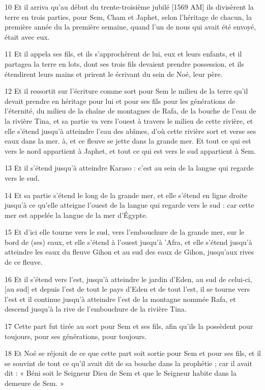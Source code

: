 \par 10 Et il arriva qu'au début du trente-troisième jubilé [1569 AM] ils divisèrent la terre en trois parties, pour Sem, Cham et Japhet, selon l'héritage de chacun, la première année du la première semaine, quand l'un de nous qui avait été envoyé, était avec eux.
\par 11 Et il appela ses fils, et ils s'approchèrent de lui, eux et leurs enfants, et il partagea la terre en lots, dont ses trois fils devaient prendre possession, et ils étendirent leurs mains et prirent le écrivant du sein de Noé, leur père.
\par 12 Et il ressortit sur l'écriture comme sort pour Sem le milieu de la terre qu'il devait prendre en héritage pour lui et pour ses fils pour les générations de l'éternité, du milieu de la chaîne de montagnes de Rafa, de la bouche de l'eau de la rivière Tina, et sa partie va vers l'ouest à travers le milieu de cette rivière, et elle s'étend jusqu'à atteindre l'eau des abîmes, d'où cette rivière sort et verse ses eaux dans la mer. à, et ce fleuve se jette dans la grande mer. Et tout ce qui est vers le nord appartient à Japhet, et tout ce qui est vers le sud appartient à Sem.
\par 13 Et il s'étend jusqu'à atteindre Karaso : c'est au sein de la langue qui regarde vers le sud.
\par 14 Et sa partie s'étend le long de la grande mer, et elle s'étend en ligne droite jusqu'à ce qu'elle atteigne l'ouest de la langue qui regarde vers le sud : car cette mer est appelée la langue de la mer d'Égypte.
\par 15 Et d'ici elle tourne vers le sud, vers l'embouchure de la grande mer, sur le bord de (ses) eaux, et elle s'étend à l'ouest jusqu'à 'Afra, et elle s'étend jusqu'à atteindre les eaux du fleuve Gihon et au sud des eaux de Gihon, jusqu'aux rives de ce fleuve.
\par 16 Et il s'étend vers l'est, jusqu'à atteindre le jardin d'Eden, au sud de celui-ci, [au sud] et depuis l'est de tout le pays d'Eden et de tout l'est, il se tourne vers l'est et il continue jusqu'à atteindre l'est de la montagne nommée Rafa, et descend jusqu'à la rive de l'embouchure de la rivière Tina.
\par 17 Cette part fut tirée au sort pour Sem et ses fils, afin qu'ils la possèdent pour toujours, pour ses générations, pour toujours.
\par 18 Et Noé se réjouit de ce que cette part soit sortie pour Sem et pour ses fils, et il se souvint de tout ce qu'il avait dit de sa bouche dans la prophétie ; car il avait dit : « Béni soit le Seigneur Dieu de Sem et que le Seigneur habite dans la demeure de Sem. »
